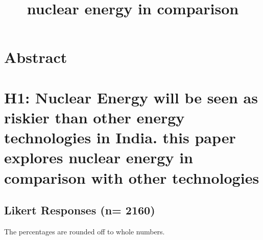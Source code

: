 \documentclass[
]{article}
\title{nuclear energy in comparison}
\author{}
\date{\vspace{-2.5em}}
\begin{document}
\maketitle

{
\setcounter{tocdepth}{2}
\tableofcontents
}
\hypertarget{abstract}{%
\section{Abstract}\label{abstract}}

\newpage

\hypertarget{h1-nuclear-energy-will-be-seen-as-riskier-than-other-energy-technologies-in-india.-this-paper-explores-nuclear-energy-in-comparison-with-other-technologies}{%
\section{H1: Nuclear Energy will be seen as riskier than other energy
technologies in India. this paper explores nuclear energy in comparison
with other
technologies}\label{h1-nuclear-energy-will-be-seen-as-riskier-than-other-energy-technologies-in-india.-this-paper-explores-nuclear-energy-in-comparison-with-other-technologies}}

\hypertarget{likert-responses-n-2160}{%
\subsection{Likert Responses (n= 2160)}\label{likert-responses-n-2160}}

The percentages are rounded off to whole numbers.
\end{document}
